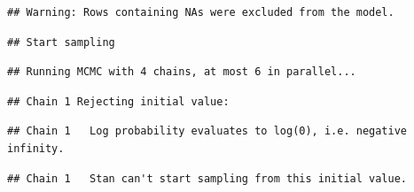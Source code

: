 \documentclass[
]{article}
\newenvironment{Shaded}{\begin{snugshade}}{\end{snugshade}}
\newcommand{\AttributeTok}[1]{\textcolor[rgb]{0.77,0.63,0.00}{#1}}
\newcommand{\CommentTok}[1]{\textcolor[rgb]{0.56,0.35,0.01}{\textit{#1}}}
\newcommand{\DecValTok}[1]{\textcolor[rgb]{0.00,0.00,0.81}{#1}}
\newcommand{\FloatTok}[1]{\textcolor[rgb]{0.00,0.00,0.81}{#1}}
\newcommand{\FunctionTok}[1]{\textcolor[rgb]{0.00,0.00,0.00}{#1}}
\newcommand{\NormalTok}[1]{#1}
\newcommand{\OtherTok}[1]{\textcolor[rgb]{0.56,0.35,0.01}{#1}}
\newcommand{\SpecialCharTok}[1]{\textcolor[rgb]{0.00,0.00,0.00}{#1}}
\newcommand{\StringTok}[1]{\textcolor[rgb]{0.31,0.60,0.02}{#1}}
\begin{document}
\begin{Shaded}
\end{Shaded}

\begin{verbatim}
## Warning: Rows containing NAs were excluded from the model.
\end{verbatim}

\begin{verbatim}
## Start sampling
\end{verbatim}

\begin{verbatim}
## Running MCMC with 4 chains, at most 6 in parallel...
\end{verbatim}

\begin{verbatim}
## Chain 1 Rejecting initial value:
\end{verbatim}

\begin{verbatim}
## Chain 1   Log probability evaluates to log(0), i.e. negative infinity.
\end{verbatim}

\begin{verbatim}
## Chain 1   Stan can't start sampling from this initial value.
\end{verbatim}
\end{document}
